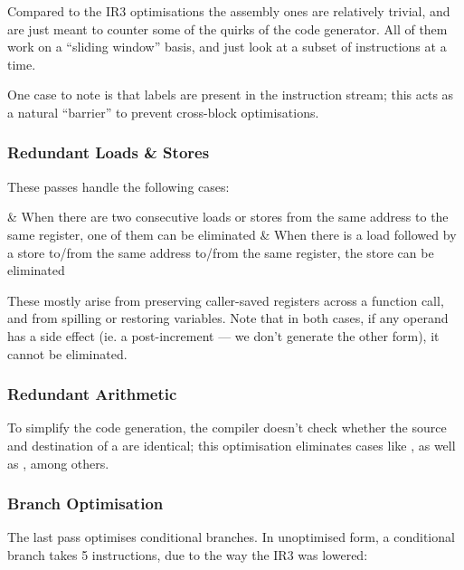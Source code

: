 \documentclass[12pt]{article}
\begin{document}
Compared to the IR3 optimisations the assembly ones are relatively trivial, and are just meant to counter some of the quirks
of the code generator. All of them work on a \enquote{sliding window} basis, and just look at a subset of instructions at a time.

One case to note is that labels are present in the instruction stream; this acts as a natural \enquote{barrier} to prevent
cross-block optimisations.


\subsubsection{Redundant Loads \& Stores}

These passes handle the following cases:

\begin{romanlist2}
&   When there are two consecutive loads or stores from the same address to the same register, one of them can be eliminated
&   When there is a load followed by a store to/from the same address to/from the same register, the store can be eliminated
\end{romanlist2}

These mostly arise from preserving caller-saved registers across a function call, and from spilling or restoring variables.
Note that in both cases, if any operand has a side effect (ie. a post-increment \eqtt{!} --- we don't generate the other form),
it cannot be eliminated.



\subsubsection{Redundant Arithmetic}

To simplify the code generation, the compiler doesn't check whether the source and destination of a  are identical;
this optimisation eliminates cases like , as well as , among others.




\subsubsection{Branch Optimisation}

The last pass optimises conditional branches. In unoptimised form, a conditional branch takes 5 instructions, due to the
way the IR3 was lowered:
\end{document}
